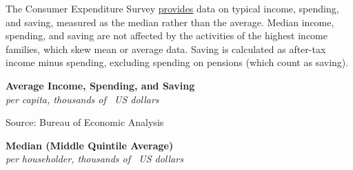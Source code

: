 \documentclass{report}
\makeatletter
\newcommand{\tbllink}[1]{\href{https://raw.githubusercontent.com/bdecon/US-chartbook/master/chartbook/data/#1}{\faTable}}
\newcommand*\short[1]{\expandafter\@gobbletwo\number\numexpr#1\relax}
\newcommand{\absnode}[3]{\node[below right, align=left] at (axis cs: #1,#2) {#3};}
\newcommand{\shdateaxisticks}{
		date coordinates in=x, axis line style={draw=none},
		xmax={2023-02-15},
		max space between ticks=40,	    
		xtick={{1990-01-01}, {1995-01-01}, {2000-01-01}, 
			{2005-01-01}, {2010-01-01}, {2015-01-01}, {2020-01-01}},
		minor xtick={},
		enlarge y limits={0.06}, enlarge x limits={0.01},
		}
\newcommand{\bbar}[2]{extra #1 ticks = {{#2}}, extra #1 tick labels = ,
		extra #1 tick style = {grid=major, grid style={thick, black!25}},}
\newcommand{\stdline}[4]{\addplot[very thick, no markers, color=#1] 
		table [x=#2, y=#3, col sep=comma] {#4};	}
\newcommand{\rbars}{
		\fill[color=black!10] (axis cs:{1990-07-01},\pgfkeysvalueof{/pgfplots/ymin}) rectangle 
			(axis cs:{1991-03-01}, \pgfkeysvalueof{/pgfplots/ymax});
		\fill[color=black!10] (axis cs:{2007-12-01},\pgfkeysvalueof{/pgfplots/ymin}) rectangle 
			(axis cs:{2009-07-01}, \pgfkeysvalueof{/pgfplots/ymax});
		\fill[color=black!10] (axis cs:{2001-03-01},\pgfkeysvalueof{/pgfplots/ymin}) rectangle 
			(axis cs:{2001-11-01}, \pgfkeysvalueof{/pgfplots/ymax});
		\fill[color=black!10] (axis cs:{2020-02-01},\pgfkeysvalueof{/pgfplots/ymin}) rectangle 
			(axis cs:{2020-05-01}, \pgfkeysvalueof{/pgfplots/ymax});}
\makeatother
\begin{document}
{\begin{minipage}{0.76\textwidth}


The Consumer Expenditure Survey \href{https://www.bls.gov/cex/tables.htm}{provides} data on typical income, spending, and saving, measured as the median rather than the average. Median income, spending, and saving are not affected by the activities of the highest income families, which skew mean or average data. Saving is calculated as after-tax income minus spending, excluding spending on pensions (which count as saving). 
\end{minipage}
\vspace{2mm}

\begin{minipage}{0.43\textwidth}
\normalsize \textbf{Average Income, Spending, and Saving}\\
\footnotesize{\textit{per capita, thousands of \unskip \ US dollars}}
\vspace{4.8cm}

\hspace{4mm} 

\footnotesize{Source: Bureau of Economic Analysis} \hfill \tbllink{inc_out_save.csv}
\end{minipage} \hspace{8mm}
\begin{minipage}{0.43\textwidth}
\normalsize \textbf{Median (Middle Quintile Average)}\\
\footnotesize{\textit{per householder, thousands of \unskip \ US dollars}}
\vspace{4.8cm}


\end{minipage}}
\end{document}
